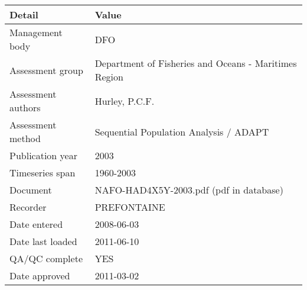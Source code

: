 \begin{table}[htb]
\centering
\begin{tabular}{lp{7cm}}
\toprule
Detail & Value \\
\midrule
Management body    & DFO                                                   \\
Assessment group   & Department of Fisheries and Oceans - Maritimes Region \\
Assessment authors & Hurley, P.C.F.                                        \\
Assessment method  & Sequential Population Analysis / ADAPT                \\
Publication year   & 2003                                                  \\
Timeseries span    & 1960-2003                                             \\
Document           & NAFO-HAD4X5Y-2003.pdf (pdf in database)               \\
Recorder           & PREFONTAINE                                           \\
Date entered       & 2008-06-03                                            \\
Date last loaded   & 2011-06-10                                            \\
QA/QC complete     & YES                                                   \\
Date approved      & 2011-03-02                                            \\
\bottomrule
\end{tabular}
\label{tab:assessdet}
\end{table}
